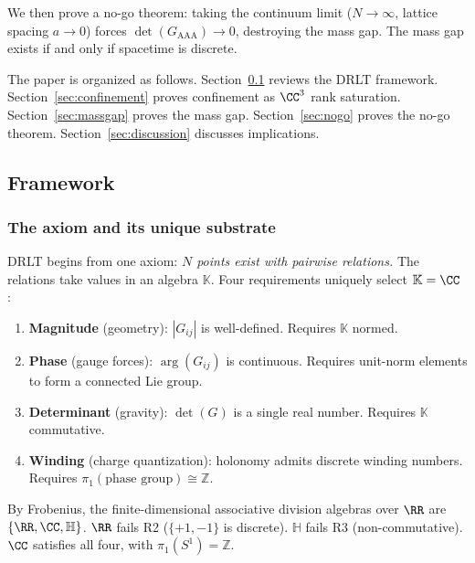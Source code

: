We then prove a no-go theorem: taking the continuum limit
($N \to \infty$, lattice spacing $a \to 0$) forces
$\det(G_{\mathrm{AAA}}) \to 0$, destroying the mass gap. The mass gap
exists if and only if spacetime is discrete.

The paper is organized as follows. Section~\ref{sec:framework} reviews
the DRLT framework. Section~\ref{sec:confinement} proves confinement as
$\CC^3$ rank saturation. Section~\ref{sec:massgap} proves the
mass gap. Section~\ref{sec:nogo} proves the no-go theorem.
Section~\ref{sec:discussion} discusses implications.

\subsection{Framework}
\label{sec:framework}

\subsubsection{The axiom and its unique substrate}

DRLT begins from one axiom: \emph{$N$ points exist with pairwise
relations.} The relations take values in an algebra $\mathbb{K}$.
Four requirements uniquely select $\mathbb{K} = \CC$
\cite{Frobenius}:

\begin{enumerate}
\item[\textbf{R1.}] \textbf{Magnitude} (geometry): $|G_{ij}|$ is
  well-defined. Requires $\mathbb{K}$ normed.
\item[\textbf{R2.}] \textbf{Phase} (gauge forces): $\arg(G_{ij})$ is
  continuous. Requires unit-norm elements to form a connected Lie group.
\item[\textbf{R3.}] \textbf{Determinant} (gravity): $\det(G)$ is a
  single real number. Requires $\mathbb{K}$ commutative.
\item[\textbf{R4.}] \textbf{Winding} (charge quantization): holonomy
  admits discrete winding numbers. Requires
  $\pi_1(\text{phase group}) \cong \mathbb{Z}$.
\end{enumerate}

\noindent
By Frobenius, the finite-dimensional associative division algebras over
$\RR$ are $\{\RR, \CC, \mathbb{H}\}$. $\RR$
fails R2 ($\{+1,-1\}$ is discrete). $\mathbb{H}$ fails R3
(non-commutative). $\CC$ satisfies all four, with
$\pi_1(S^1) = \mathbb{Z}$.

